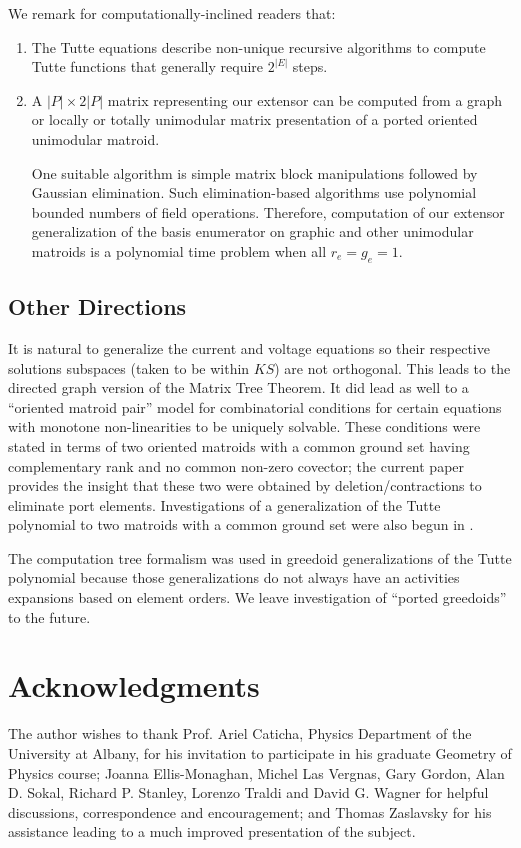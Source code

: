 \documentclass[12pt]{article}
\theoremstyle{definition}
\newcommand{\FieldK}{\ensuremath{K}}
\newcommand{\Card}[1]{\ensuremath{{\left|#1\right|}}}
\begin{document}
We remark for computationally-inclined readers that: 
\begin{enumerate}
\item The Tutte equations
describe non-unique recursive algorithms to compute Tutte functions
that generally require $2^\Card{E}$
steps. 
\item  A $\Card{P}\times 2\Card{P}$ matrix representing our
extensor 
can be computed from a 
graph or locally or totally unimodular 
matrix presentation of a ported oriented unimodular matroid.

One suitable algorithm is simple matrix block manipulations followed by
Gaussian elimination.  Such elimination-based algorithms
use polynomial bounded numbers of field operations.  Therefore, computation
of our extensor generalization of the basis enumerator on graphic
and other unimodular matroids is a polynomial time
problem when all $r_e=g_e=1$.

\end{enumerate}

\subsection{Other Directions}
\label{Peripheral}

It is natural to generalize the current and voltage equations 
so their respective solutions subspaces (taken to be within $\FieldK S$)
are 
not orthogonal\cite{sdcBDIMatroid}.  
This leads to the directed graph version of the Matrix Tree
Theorem.  It did lead as well to a ``oriented matroid pair'' model for 
combinatorial conditions
for certain equations with monotone non-linearities to be uniquely 
solvable\cite{sdcOMP}.  These conditions were stated in terms of
two oriented matroids with a common ground set
having complementary rank and no common non-zero covector; the current paper 
provides the insight that these two were obtained by deletion/contractions
to eliminate port elements.  Investigations of a generalization of the 
Tutte polynomial to two matroids with a common ground set were also
begun in \cite{WelshKayibiLinking}.

The computation tree formalism was used in
greedoid generalizations\cite{GordonMcMachonGreedoid}
of the Tutte polynomial because those generalizations do not
always have an activities expansions based on element orders.
We leave investigation of ``ported greedoids'' to the future.

\section{Acknowledgments}

The author wishes to thank Prof. Ariel Caticha, Physics Department of
the University at Albany, for his invitation to participate in his
graduate Geometry of Physics course; Joanna Ellis-Monaghan, Michel Las
Vergnas, Gary Gordon, Alan D. Sokal, Richard P. Stanley, Lorenzo
Traldi and David G. Wagner for helpful discussions, correspondence and
encouragement; and Thomas Zaslavsky for his assistance leading to a
much improved presentation of the subject.

%


\end{document}
